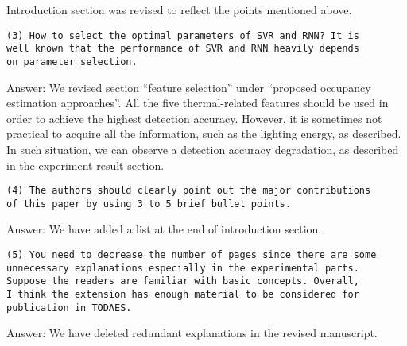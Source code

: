 Introduction section was revised to reflect the points mentioned above.

\begin{verbatim}
(3) How to select the optimal parameters of SVR and RNN? It is
well known that the performance of SVR and RNN heavily depends
on parameter selection.
\end{verbatim}

Answer:
We revised section ``feature selection'' under ``proposed occupancy estimation
approaches''. All the five thermal-related features should be used in order to
achieve the highest detection accuracy. However, it is sometimes not practical
to acquire all the information, such as the lighting energy, as described.  In
such situation, we can observe a detection accuracy degradation, as described
in the experiment result section.



\begin{verbatim}
(4) The authors should clearly point out the major contributions
of this paper by using 3 to 5 brief bullet points.
\end{verbatim}

Answer: We have added a list at the end of introduction section.


\begin{verbatim}
(5) You need to decrease the number of pages since there are some
unnecessary explanations especially in the experimental parts.
Suppose the readers are familiar with basic concepts. Overall,
I think the extension has enough material to be considered for
publication in TODAES.
\end{verbatim}

Answer: We have deleted redundant explanations in the revised manuscript.
